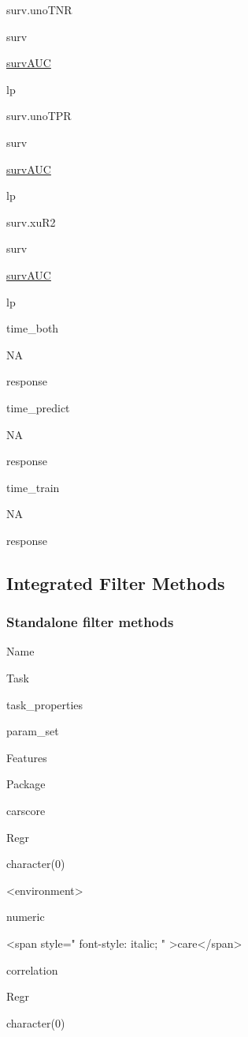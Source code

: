 \documentclass[]{article}
\begin{document}
surv.unoTNR

surv

\href{https://cran.r-project.org/package=survAUC}{survAUC}

lp

surv.unoTPR

surv

\href{https://cran.r-project.org/package=survAUC}{survAUC}

lp

surv.xuR2

surv

\href{https://cran.r-project.org/package=survAUC}{survAUC}

lp

time\_both

NA

response

time\_predict

NA

response

time\_train

NA

response

\hypertarget{list-filters}{%
\subsection{Integrated Filter Methods}\label{list-filters}}

\hypertarget{fs-filter-list}{%
\subsubsection{Standalone filter methods}\label{fs-filter-list}}

Name

Task

task\_properties

param\_set

Features

Package

carscore

Regr

character(0)

\textless{}environment\textgreater{}

numeric

\textless{}span style=" font-style: italic; " \textgreater{}care\textless{}/span\textgreater{}

correlation

Regr

character(0)
\end{document}

